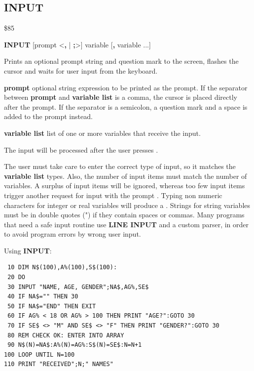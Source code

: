 \subsection{INPUT}
\begin{description}[leftmargin=2cm,style=nextline]
\item [Token:] \$85
\item [Format:] {\bf INPUT} [prompt <{\bf,} | {\bf;}>]
		variable [{\bf,} variable ...]
\item [Usage:] Prints an optional
               prompt string and question mark to the screen,
               flashes the cursor and waits for user input
               from the keyboard.

               {\bf prompt} optional string expression to be printed
               as the prompt.
               If the separator between {\bf prompt} and {\bf variable list}
               is a comma, the cursor is placed directly after
               the prompt. If the separator is a semicolon,
               a question mark and a space is added to the prompt instead.

               {\bf variable list} list of one or more
               variables that receive the input.

               The input will be processed after the user presses .

\item [Remarks:] The user must take care to enter the correct
               type of input, so it matches the {\bf variable list} types.
               Also, the number of input items must match the number
               of variables. A surplus of input items will be ignored,
               whereas too few input items trigger another request for input
               with the prompt .
               Typing non numeric characters for integer or real
               variables will produce a .
               Strings for string variables must be in double quotes (")
               if they contain spaces or commas.
               Many programs that need a safe input routine use
               {\bf LINE INPUT} and a custom parser, in order
               to avoid program errors by wrong user input.

\item [Example:] Using {\bf INPUT}:
\begin{tcolorbox}[colback=black,coltext=white]
\verbatimfont{\codefont}
\begin{verbatim}
 10 DIM N$(100),A%(100),S$(100):
 20 DO
 30 INPUT "NAME, AGE, GENDER";NA$,AG%,SE$
 40 IF NA$="" THEN 30
 50 IF NA$="END" THEN EXIT
 60 IF AG% < 18 OR AG% > 100 THEN PRINT "AGE?":GOTO 30
 70 IF SE$ <> "M" AND SE$ <> "F" THEN PRINT "GENDER?":GOTO 30
 80 REM CHECK OK: ENTER INTO ARRAY
 90 N$(N)=NA$:A%(N)=AG%:S$(N)=SE$:N=N+1
100 LOOP UNTIL N=100
110 PRINT "RECEIVED";N;" NAMES"
\end{verbatim}
\end{tcolorbox}
\end{description}

